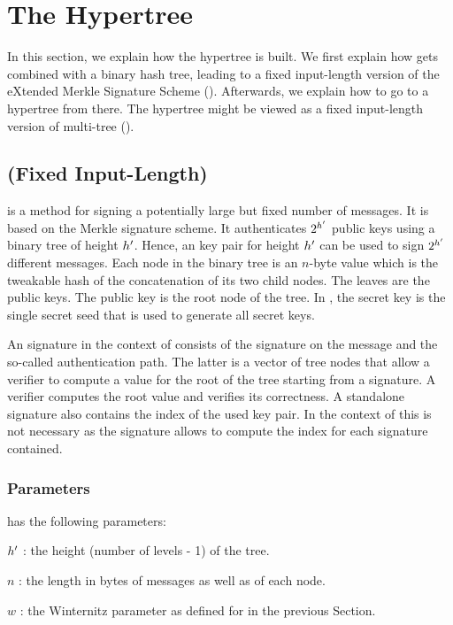 \section{The \spx Hypertree}
In this section, we explain how the \spx hypertree is built. We first
explain how \wotsp gets combined with a binary hash tree, leading to a
fixed input-length version of the eXtended Merkle Signature Scheme
(\xmss). Afterwards, we explain how to go to a hypertree from there.
The hypertree might be viewed as a fixed input-length version of
multi-tree \xmss (\xmssm).

\subsection{(Fixed Input-Length) \xmss}\label{sec:xmss}
   \xmss is a method for signing a potentially large but fixed number of
   messages.  It is based on the Merkle signature scheme. It authenticates
   $2^{h'}$ \wotsp public keys using a binary tree of height ${h'}$.
   Hence, an \xmss key pair for height ${h'}$ can be used to sign
   $2^{h'}$ different messages.
   Each node in the binary tree is an $n$-byte value which is the tweakable hash
   of the concatenation of its two child nodes. The leaves are the \wotsp public
   keys. The \xmss public key is the root node of the tree.
   In \spx, the \xmss
   secret key is the single secret seed that is used to generate all \wotsp
   secret keys.

   An \xmss signature in the context of \spx consists of the
   \wotsp signature on the message and the so-called authentication path.
   The latter is a vector of tree nodes that allow a verifier to compute
   a value for the root of the tree starting from a \wotsp signature.  A
   verifier computes the root value and verifies its correctness. A standalone
   \xmss signature also contains the index of the used \wotsp key pair. In the
   context of \spx this is not necessary as the \spx signature allows to
   compute the index for each \xmss signature contained.

\subsubsection{\xmss Parameters}

\xmss has the following parameters:
\begin{description}
 \item  ${h'}$ : the height (number of levels - 1) of the tree.
 \item  $n$ : the length in bytes of messages as well as of each node.
 \item  $w$ : the Winternitz parameter as defined for \wotsp in the
 previous Section.
\end{description}

